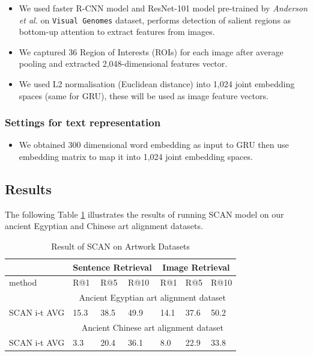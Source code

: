 \begin{itemize}
    \item We used faster R-CNN model and ResNet-101 model pre-trained by \textit{Anderson et al.} on \verb|Visual Genomes| dataset, performs detection of salient regions as bottom-up attention to extract features from images. 
    \item We captured 36 Region of Interests (ROIs) for each image after average pooling and extracted 2,048-dimensional features vector.
    \item We used L2 normalisation (Euclidean distance) into 1,024 joint embedding spaces (same for GRU), these will be used as image feature vectors.
\end{itemize}

\subsubsection{Settings for text representation}

\begin{itemize}
    \item We obtained 300 dimensional word embedding as input to GRU then use embedding matrix to map it into 1,024 joint embedding spaces.
\end{itemize}

\subsection{Results}

The following Table \ref{table:resultscan} illustrates the results of running SCAN model on our ancient Egyptian and Chinese art alignment datasets.

\begin{table}[h!]
\centering
\begin{tabular}{lllllll}
                       & \multicolumn{3}{c}{Sentence Retrieval} & \multicolumn{3}{c}{Image Retrieval} \\ \hline
method                 & R@1         & R@5         & R@10       & R@1        & R@5        & R@10      \\ \hline
\multicolumn{1}{r}{}   & \multicolumn{6}{c}{Ancient Egyptian art alignment dataset}                   \\ \hline
SCAN i-t AVG & 15.3        & 38.5        & 49.9       & 14.1       & 37.6       & 50.2      \\ \hline
\multicolumn{1}{r}{}   & \multicolumn{6}{c}{Ancient Chinese art alignment dataset}                    \\ \hline
SCAN i-t AVG & 3.3         & 20.4        & 36.1       & 8.0        & 22.9       & 33.8     
\end{tabular}
\caption{Result of SCAN on Artwork Datasets}
\label{table:resultscan}
\end{table}


